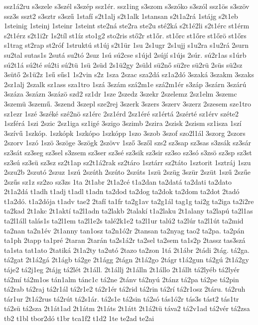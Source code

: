 {ssz1á2ru
s3szele
s3szél
s3szép
ssz1ér.
ssz1ing
s3szom
s3szóko
s3szól
ssz1ös
s3szöv
ssz3s
sszt2
s3sztr
s3szű
1stafí
s2t1alj
s2t1alk
1stansan
s2t1a2rá
1stájg
s2t1eb
1steinig
1steinj
1steinr
1steint
ste2ná
ste2ra
ste2u
sté2ká
s2t1é2li
s2t1érc
st1érm
s2t1érz
s2t1i2r
1s2tíl
st1íz
sto1g2
sto2ris
stő2r
st1őr.
st1őrc
st1őre
st1őrö
st1őrs
s1trag
st2rap
st2róf
1struktú
st1új
s2t1ür
1su
2s1ugr
2s1ujj
s1u2ra
s1u2rá
2surn
su2tal
sutas1s
2sutá
su2tó
2suz
1sú
sú2cse
s1újd
2sújí
s1újs
2súr.
sú2r1as
s1úrb
sú2t1á
sú2té
sú2ti
sú2tü
1sü
2süd
2s1ü2gy
2süld
sü2nő
sü2re
sü2rü
2süs
sü2sz
3sütő
2s1ü2z
1sű
sűs1
1s2vin
s2z
1sza
2szac
sza2dá
sz1a2dó
3szaká
3szakm
3szaks
2sz1alj
2szalk
sz1ass
sza1tro
1szá
3szám
szá2m1e
szá2m1ér
s3záp
3szárn
3szárú
3száza
3százn
3százö
szd2
sz1dr
1sze
2szedz
3szekr
2szelemz
2sz1elm
3szemc
3szemü
3szemű.
3szend
3szepl
sze2rej
3szerk
3szers
3szerv
3szerz
2szesem
sze1tro
sz1ezr
1szé
3széké
szé2nö
sz1érc
2sz1érd
2sz1éré
sz1értá
2szérté
sz1érv
széte2
1szférá
1szi
2szic
2sz1iga
sz1igé
3szigo
3szimb
2szira
2szisk
2szism
sz1isza
1szí
3szívű
1szkóp.
1szkópk
1szkópo
1szkópp
1szo
3szob
3szof
szo2l1ál
3szorg
2szors
2szorv
1szó
1szö
3szöge
3szögk
2szövv
1sző
3szől
szs2
sz3sap
sz3sas
s3zsák
sz3sár
sz3sát
sz3seg
sz3sel
s3zsem
sz3ser
sz3sé
sz3sik
sz3sir
sz3so
sz3só
s3zsö
sz3sp
sz3st
sz3sú
sz3sü
sz3sz
sz2t1ap
sz2t1á2rak
sz2táro
1sztárr
sz2táto
1sztorit
1sztráj
1szu
2szu2b
2szutó
2szuz
1szú
2szúth
2szúto
2szúts
1szü
2szüg
3szür
2szüt
1szű
2szűe
2szűs
sz1z
sz2zo
sz3zs
1ta
2t1abr
2t1a2cé
t1a2dan
ta2datá
ta2dati
ta2dato
2t1a2dá
t1adh
t1adj
t1adl
t1adn
ta2dod
ta2dog
ta2dok
ta2dom
ta2dot
2tadó
t1a2dó.
t1a2dója
t1adv
tae2
2tafí
ta1fr
ta2g1av
ta2g1ál
tag1g
tai2g
ta2iga
ta2i2re
ta2kad
2t1akc
2t1aktí
ta2l1adn
ta2lakb
2talakí
t1a2laku
2t1alany
ta2lapú
ta2l1as
ta2l1áll
talás1s
ta2l1em
ta2l1e2s
talé2k1e2
ta2l1ur
talú2
ta2lúr
ta2l1út
ta2mid
ta2nan
ta2n1év
2t1anny
tan1osz
ta2n1ó2r
2tansan
ta2nyag
tao2
ta2pa.
ta2pán
ta1ph
2tapp
ta1pré
2taran
2tarán
ta2s1á2r
ta2sel
ta2sem
ta1s2p
2tassz
tas3szá
ta1sta
tat1ato
2tatiká
2t1a2ty
ta2utó
2tazo
ta2zon
1tá
2t1ábr
2tádi
2tág.
tá2ga.
tá2gat
2t1á2gá
2t1ágb
tá2ge
2t1ágg
2tágn
2t1á2go
2tágr
t1á2gun
tá2gú
2t1á2gy
táje2
tá2j1eg
2tájg
tá2lét
2t1áll.
2t1állj
2t1álln
2t1állo
2t1állt
tá2lyéb
tá2lyér
tá2mí
tá2m1os
tán1alm
tánc1c
tá2ne
2tánv
tá2nyú
2tánz
tá2pa
tá2pe
tá2pin
tá2rab
tá2raj
tá2r1ál
tá2r1e2
tá2r1ér
tá2rid
tá2rin
tá2rí
tá2r1osz
2táru.
tá2ruh
tár1ur
2t1á2rus
tá2rút
tá2s1ár.
tá2s1e
tá2sin
tá2só
tás1ó2r
tás3s
tást2
tás1tr
tá2sü
tá2sza
2t1át1ad
2t1átm
2t1áts
2t1átt
2t1á2tü
táva2
tá2v1ad
tá2vér
tá2zsa
tb2
t1bl
tbor2dó
t1br
tca1f2
t1d2
1te
te2ad
te2ai
}
